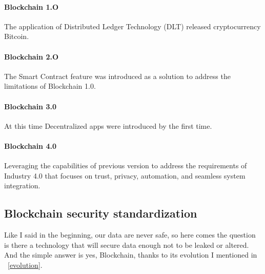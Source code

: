 \documentclass[10pt,english,a4paper]{article}
\begin{document}
\paragraph{Blockchain 1.O}
The application of Distributed Ledger Technology (DLT) released cryptocurrency Bitcoin.
\cite{Suroso:SKCK}
\paragraph{Blockchain 2.O}
The Smart Contract feature was introduced as a solution to address the limitations of Blockchain 1.0.
\cite{Suroso:SKCK}
\paragraph{Blockchain 3.0}
At this time Decentralized apps were introduced by the first time. 
\cite{Suroso:SKCK}
\paragraph{Blockchain 4.0}
Leveraging the capabilities of previous version to address the requirements of Industry 4.0 that focuses on trust, privacy, automation, and seamless system integration.
\cite{Suroso:SKCK}

\subsection{Blockchain security standardization} %
Like I said in the beginning, our data are never safe, so here comes the question is there a technology that will secure data enough not to be leaked or altered. And the simple answer is yes, Blockchain, thanks to its evolution I mentioned in ~\ref{evolution}.
\end{document}
